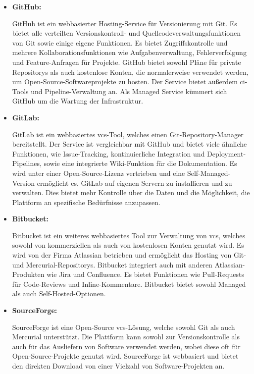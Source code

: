 \begin{itemize}
    \item{
        \textbf{GitHub:}\par
        GitHub ist ein webbasierter Hosting-Service für Versionierung mit Git.
        Es bietet alle verteilten Versionskontroll- und Quellcodeverwaltungsfunktionen von Git sowie einige
        eigene Funktionen.
        Es bietet Zugriffskontrolle und mehrere Kollaborationsfunktionen wie Aufgabenverwaltung, Fehlerverfolgung und
        Feature-Anfragen für Projekte.
        GitHub bietet sowohl Pläne für private Repositorys als auch kostenlose Konten, die normalerweise verwendet
        werden, um Open-Source-Softwareprojekte zu hosten.
        Der Service bietet außerdem \acrshort{ci}-Tools und Pipeline-Verwaltung an.
        Als Managed Service kümmert sich GitHub um die Wartung der Infrastruktur.
    }

    \item{
        \textbf{GitLab:}\par
        GitLab ist ein webbasiertes \acrshort{vcs}-Tool, welches einen Git-Repository-Manager bereitstellt.
        Der Service ist vergleichbar mit GitHub und bietet viele ähnliche Funktionen, wie Issue-Tracking,
        kontinuierliche Integration und Deployment-Pipelines, sowie eine integrierte Wiki-Funktion für die
        Dokumentation.
        Es wird unter einer Open-Source-Lizenz vertrieben und eine Self-Managed-Version ermöglicht es,
        GitLab auf eigenen Servern zu installieren und zu verwalten.
        Dies bietet mehr Kontrolle über die Daten und die Möglichkeit, die Plattform an spezifische Bedürfnisse
        anzupassen.
    }

    \item{
        \textbf{Bitbucket:}\par
        Bitbucket ist ein weiteres webbasiertes Tool zur Verwaltung von \acrshort{vcs}, welches sowohl von
        kommerziellen als auch von kostenlosen Konten genutzt wird.
        Es wird von der Firma Atlassian betrieben und ermöglicht das Hosting von Git- und Mercurial-Repositorys.
        Bitbucket integriert auch mit anderen Atlassian-Produkten wie Jira und Confluence.
        Es bietet Funktionen wie Pull-Requests für Code-Reviews und Inline-Kommentare.
        Bitbucket bietet sowohl Managed als auch Self-Hosted-Optionen.
    }

    \item{
        \textbf{SourceForge:}\par
        SourceForge ist eine Open-Source \acrshort{vcs}-Lösung, welche sowohl Git als auch Mercurial unterstützt.
        Die Plattform kann sowohl zur Versionskontrolle als auch für das Ausliefern von Software verwendet werden,
        wobei diese oft für Open-Source-Projekte genutzt wird.
        SourceForge ist webbasiert und bietet den direkten Download von einer Vielzahl von Software-Projekten an.
    }
\end{itemize}

